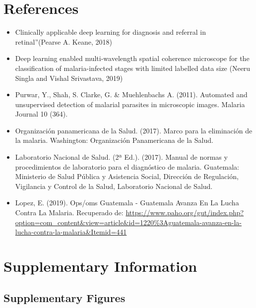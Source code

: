 \documentclass{article}
\begin{document}
\section{References}
\begin{itemize}
\item Clinically applicable deep learning for diagnosis and referral in retinal”(Pearse A. Keane, 2018)
\item Deep learning enabled multi-wavelength spatial coherence microscope for the classification of malaria-infected stages with limited labelled data size (Neeru Singla and Vishal Srivastava, 2019)
\item Purwar, Y., Shah, S. Clarke, G. \& Muehlenbachs A. (2011). Automated and unsupervised detection of malarial parasites in microscopic images. Malaria Journal 10 (364).
\item Organización panamericana de la Salud. (2017). Marco para la eliminación de la malaria. Washington: Organización Panamericana de la Salud.
\item Laboratorio Nacional de Salud. (2ª Ed.). (2017). Manual de normas y procedimientos de laboratorio para el diagnóstico de malaria. Guatemala: Ministerio de Salud Pública y Asistencia Social, Dirección de Regulación, Vigilancia y Control de la Salud, Laboratorio Nacional de Salud.
\item Lopez, E. (2019). Ops/oms Guatemala - Guatemala Avanza En La Lucha Contra La Malaria. Recuperado de: \url{https://www.paho.org/gut/index.php?option=com_content&view=article&id=1220%3Aguatemala-avanza-en-la-lucha-contra-la-malaria&Itemid=441}


\end{itemize}






\section{Supplementary Information}
\subsection{Supplementary Figures}
\end{document}
